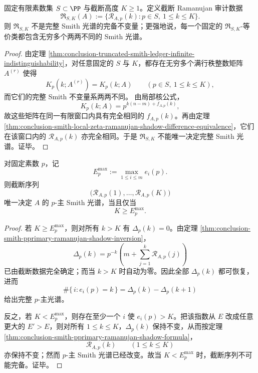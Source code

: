 \begin{theorem}\label{thm:conclusion-smith-truncated-ramanujan-audit-incompleteness}
固定有限素数集 \(S\subset \PP\) 与截断高度 \(K\ge 1\)。定义截断 Ramanujan 审计数据
\[
\mathfrak R_{S,K}(A):=\{\mathcal R_{A,p}(k):p\in S,\ 1\le k\le K\}.
\]
则 \(\mathfrak R_{S,K}\) 不是完整 Smith 光谱的完备不变量；更强地说，每一个固定的 \(\mathfrak R_{S,K}\)-等价类都包含无穷多个两两不同的 Smith 光谱。
\end{theorem}
\begin{proof}
由定理 \ref{thm:conclusion-truncated-smith-ledger-infinite-indistinguishability}，对任意固定的 \(S\) 与 \(K\)，都存在无穷多个满行秩整数矩阵 \(A^{(r)}\) 使得
\[
K_p(k;A^{(r)})=K_p(k;A)
\qquad
(p\in S,\ 1\le k\le K),
\]
而它们的完整 Smith 不变量系两两不同。
由局部核公式，
\[
K_p(k;A)=p^{k(n-m)+f_{A,p}(k)},
\]
故这些矩阵在同一有限窗口内具有完全相同的 \(f_{A,p}(k)\)。再由定理 \ref{thm:conclusion-smith-local-zeta-ramanujan-shadow-difference-equivalence}，它们在该窗口内的 \(\mathcal R_{A,p}(k)\) 亦完全相同。于是 \(\mathfrak R_{S,K}\) 不能唯一决定完整 Smith 光谱。证毕。
\end{proof}

\begin{theorem}\label{thm:conclusion-smith-pprimary-ramanujan-cutoff-completeness}
对固定素数 \(p\)，记
\[
E_p^{\max}:=\max_{1\le i\le m}e_i(p).
\]
则截断序列
\[
\bigl(\mathcal R_{A,p}(1),\dots,\mathcal R_{A,p}(K)\bigr)
\]
唯一决定 \(A\) 的 \(p\)-主 Smith 光谱，当且仅当
\[
K\ge E_p^{\max}.
\]
\end{theorem}
\begin{proof}
若 \(K\ge E_p^{\max}\)，则对所有 \(k>K\) 有 \(\Delta_p(k)=0\)。由定理 \ref{thm:conclusion-smith-pprimary-ramanujan-shadow-inversion}，
\[
\Delta_p(k)=p^{-k}\left(m+\sum_{j=1}^{k}\mathcal R_{A,p}(j)\right)
\]
已由截断数据完全确定；而当 \(k>K\) 时自动为零。因此全部 \(\Delta_p(k)\) 都可恢复，进而
\[
\#\{\,i:e_i(p)=k\,\}=\Delta_p(k)-\Delta_p(k+1)
\]
给出完整 \(p\)-主光谱。

反之，若 \(K<E_p^{\max}\)，则存在至少一个 \(i\) 使 \(e_i(p)>K\)。把该指数从 \(E\) 改成任意更大的 \(E'>E\)，则对所有 \(1\le k\le K\)，\(\Delta_p(k)\) 保持不变，从而按定理 \ref{thm:conclusion-smith-pprimary-ramanujan-shadow-formula}，
\[
\mathcal R_{A,p}(k)
\qquad
(1\le k\le K)
\]
亦保持不变；然而 \(p\)-主 Smith 光谱已经改变。故当 \(K<E_p^{\max}\) 时，截断序列不可能完备。证毕。
\end{proof}

